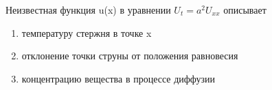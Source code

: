Неизвестная функция u(x) в уравнении \(U_t=a^2U_{xx}\) описывает

\begin{enumerate}[label=\arabic*)]
    \item температуру стержня в точке x
    \item отклонение точки струны от положения равновесия
    \item концентрацию вещества в процессе диффузии
\end{enumerate}

